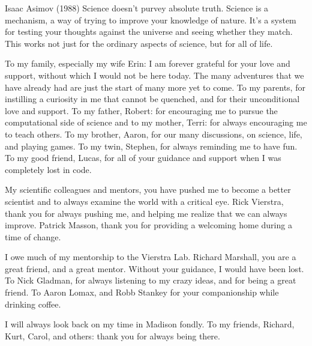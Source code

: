 \begin{wbepi}{Isaac Asimov (1988)}
Science doesn't purvey absolute truth. Science is a mechanism, a way of trying to improve your knowledge of nature. It's a system for testing your thoughts against the universe and seeing whether they match. This works not just for the ordinary aspects of science, but for all of life.
\end{wbepi}
	To my family, especially my wife Erin: I am forever grateful for your love and support, without which I would not be here today. The many adventures that we have already had are just the start of many more yet to come. To my parents, for instilling a curiosity in me that cannot be quenched, and for their unconditional love and support. To my father, Robert: for encouraging me to pursue the computational side of science and to my mother, Terri: for always encouraging me to teach others. To my brother, Aaron, for our many discussions, on science, life, and playing games. To my twin, Stephen, for always reminding me to have fun. To my good friend, Lucas, for all of your guidance and support when I was completely lost in code.  
	
	My scientific colleagues and mentors, you have pushed me to become a better scientist and to always examine the world with a critical eye. Rick Vierstra, thank you for always pushing me, and helping me realize that we can always improve. Patrick Masson, thank you for providing a welcoming home during a time of change. 
	
	I owe much of my mentorship to the Vierstra Lab. Richard Marshall, you are a great friend, and a great mentor. Without your guidance, I would have been lost. To Nick Gladman, for always listening to my crazy ideas, and for being a great friend. To Aaron Lomax, and Robb Stankey for your companionship while drinking coffee.
	
	I will always look back on my time in Madison fondly. To my friends, Richard, Kurt, Carol, and others: thank you for always being there.
